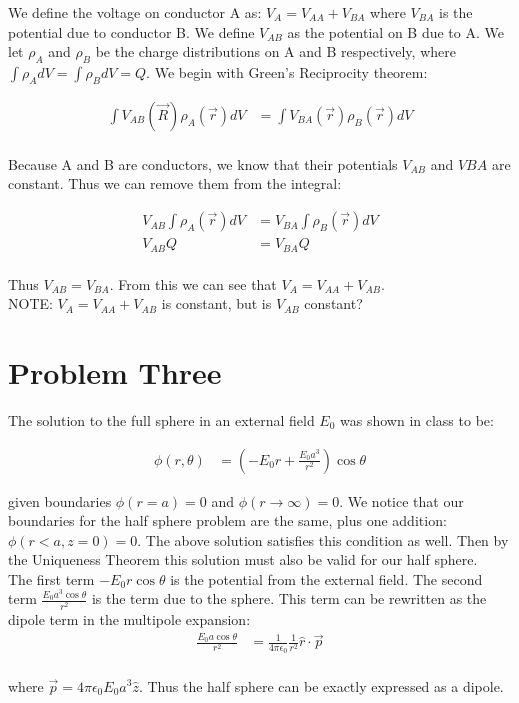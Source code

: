 \documentclass[10pt]{article} %
\begin{document}
We define the voltage on conductor A as: $V_A = V_{AA} + V_{BA}$ where $V_{BA}$ is the potential due to conductor B. We define $V_{AB}$ as the potential on B due to A. We let $\rho_A$ and $\rho_B$ be the charge distributions on A and B respectively, where $\int\rho_AdV = \int\rho_BdV = Q$. We begin with Green's Reciprocity theorem:

\begin{align*}
  \int V_{AB}(\vec{R})\rho_A(\vec{r})dV &= \int V_{BA}(\vec{r})\rho_B(\vec{r})dV\\
\end{align*}

Because A and B are conductors, we know that their potentials $V_{AB}$ and $V{BA}$ are constant. Thus we can remove them from the integral:

\begin{align*}
  V_{AB}\int\rho_A(\vec{r})dV &= V_{BA}\int\rho_B(\vec{r})dV\\
  V_{AB}Q &= V_{BA}Q\\
\end{align*}

Thus $V_{AB} = V_{BA}$. From this we can see that $V_A = V_{AA} + V_{AB}$.\\

NOTE: $V_{A} = V_{AA} + V_{AB}$ is constant, but is $V_{AB}$ constant?\\

\section{Problem Three}
The solution to the full sphere in an external field $E_0$ was shown in class to be:

\begin{align*}
  \phi(r,\theta) &= \left(-E_0r + \frac{E_0a^3}{r^2}\right)\cos\theta
\end{align*}

given boundaries $\phi(r=a) = 0$ and $\phi(r\rightarrow\infty) = 0$. We notice that our boundaries for the half sphere problem are the same, plus one addition: $\phi(r<a, z=0) = 0$. The above solution satisfies this condition as well. Then by the Uniqueness Theorem this solution must also be valid for our half sphere.\\

The first term $-E_0r\cos\theta$ is the potential from the external field. The second term $\frac{E_0a^3\cos\theta}{r^2}$ is the term due
to the sphere. This term can be rewritten as the dipole term in the multipole expansion:\\

\begin{align*}
  \frac{E_0a\cos\theta}{r^2} &= \frac{1}{4\pi\epsilon_0}\frac{1}{r^2} \hat{r} \cdot \vec{p}\\
\end{align*}

where $\vec{p} = 4\pi\epsilon_0E_0 a^3 \hat{z}$. Thus the half sphere can be exactly expressed as a dipole.\\
\end{document}
